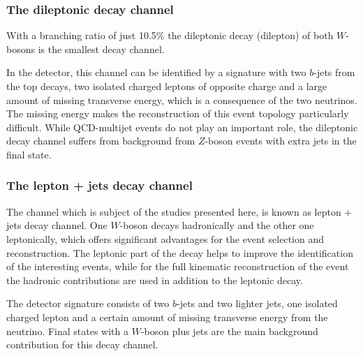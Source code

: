 \subsubsection{The dileptonic decay channel}
With a branching ratio of just 10.5\% the dileptonic decay (dilepton) of both $W$-bosons is the smallest decay channel. 

 In the detector, this channel can be identified by a  signature with two $b$-jets from the top decays, two isolated charged leptons of opposite charge and a large amount of missing transverse energy, which is  a consequence of the two neutrinos.
The missing energy makes the reconstruction of this event topology particularly difficult. While QCD-multijet events do not play an important role, the dileptonic decay channel suffers from background from $Z$-boson events with extra jets in the final state.   

\subsubsection{The lepton + jets  decay channel}
The channel which is subject of the studies presented here, is  known as lepton + jets decay channel. One $W$-boson decays hadronically and  the other one leptonically, which offers significant advantages for the event selection and reconstruction. The leptonic  part of the decay helps to improve the identification of the interesting   events, while for the full kinematic reconstruction of the event the hadronic contributions are used in addition to the leptonic decay. 

 The detector signature consists of two $b$-jets and two lighter jets, one isolated charged lepton and a certain amount of missing transverse energy from the neutrino. Final states with a $W$-boson plus jets are the main background contribution for this decay channel.   
  

 
 \vspace{0.5cm} 
  
  
  
  
  
  
  
  
  
